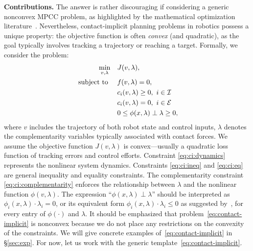 \textbf{Contributions.}
The answer is rather discouraging if considering a generic nonconvex MPCC problem, as highlighted by the mathematical optimization literature~\cite{fletcher2000practical, SIOPT-FLETCHER-2006, OMS-Fletcher-2004}. Nevertheless, contact-implicit planning problems in robotics possess a unique property: the objective function is often \emph{convex} (and quadratic), as the goal typically involves tracking a trajectory or reaching a target. Formally, we consider the problem:
\begin{subequations}\label{eq:contact-implicit}
    \begin{align}
    \min_{v, \lambda} \quad & J(v, \lambda), \\
    \text{ subject to } \quad & f(v, \lambda) = 0, \label{eq:ci:dynamics}\\
    & c_i(v, \lambda) \geq 0, \ i \in {\cal I}  \label{eq:ci:ineq}\\
    & c_i(v, \lambda) = 0, \ i \in {\cal E} \label{eq:ci:eq} \\
    & 0 \leq \phi(x,\lambda) \perp \lambda \geq 0,\label{eq:ci:complementarity}
\end{align}
\end{subequations}
where $v$ includes the trajectory of both robot state and control inputs, $\lambda$ denotes the complementarity variables typically associated with contact forces. We assume the objective function $J(v, \lambda)$ is convex---usually a quadratic loss function of tracking errors and control efforts. Constraint \eqref{eq:ci:dynamics} represents the nonlinear system dynamics. Constraints \eqref{eq:ci:ineq} and \eqref{eq:ci:eq} are general inequality and equality constraints. The complementarity constraint \eqref{eq:ci:complementarity} enforces the relationship between $\lambda$ and the nonlinear function $\phi(v,\lambda)$. The expression ``$\phi(x,\lambda) \perp \lambda$'' should be interpreted as $\phi_i(x,\lambda) \cdot \lambda_i = 0$, or its equivalent form $\phi_i(x,\lambda) \cdot \lambda_i \leq 0$ as suggested by~\cite{SIOPT-FLETCHER-2006}, for every entry of $\phi(\cdot)$ and $\lambda$. It should be emphasized that problem~\eqref{eq:contact-implicit} is nonconvex because we do not place any restrictions on the convexity of the constraints. We will give concrete examples of~\eqref{eq:contact-implicit} in \S\ref{sec:exp}. For now, let us work with the generic template~\eqref{eq:contact-implicit}.


